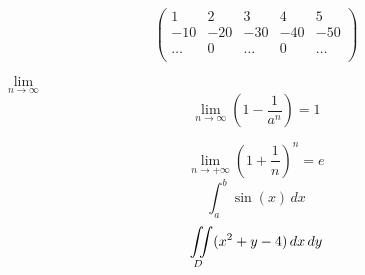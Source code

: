 \documentclass[12pt,legalpaper,notitlepage]{article}
\begin{document}
$$
\left(
\begin{array}{ccccc}
1 & 2 & 3 & 4 & 5 \\
-10 & -20 & -30 & -40 & -50 \\
\ldots & 0 & \ldots & 0 & \ldots \\
\end{array} \right)
$$

$\lim\limits _{n \to \infty}$
$$\lim _{n \to \infty}
\left(
1-\frac{1}{a^n}
\right) = 1
$$

$$ \lim_{n \to +\infty}
\left(
1+\frac{1}{n}
\right)^n
=e
$$
$$ \int _a^b \sin (x) \, dx
$$
$$
\iint\displaylimits _D (x^2+y-4) \, dx \, dy
$$
\end{document}
